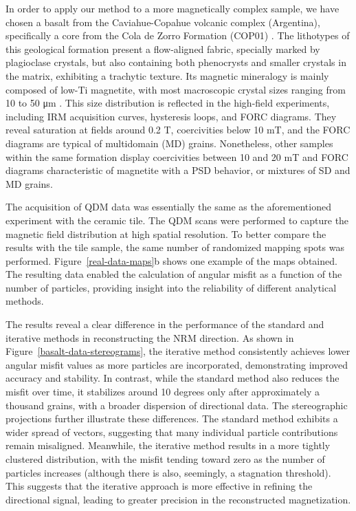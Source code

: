 In order to apply our method to a more magnetically complex sample, we have chosen a basalt from the Caviahue-Copahue volcanic complex (Argentina), specifically a core from the Cola de Zorro Formation (COP01) \citep{Moncinhatto2019}. The lithotypes of this geological formation present a flow-aligned fabric, specially marked by plagioclase crystals, but also containing both phenocrysts and smaller crystals in the matrix, exhibiting a trachytic texture. Its magnetic mineralogy is mainly composed of low-Ti magnetite, with most macroscopic crystal sizes ranging from 10 to 50 \si{\micro\meter} \citep{Moncinhatto2019}. This size distribution is reflected in the high-field experiments, including IRM acquisition curves, hysteresis loops, and FORC diagrams. They reveal saturation at fields around 0.2 \si{T}, coercivities below 10 \si{mT}, and the FORC diagrams are typical of multidomain (MD) grains. Nonetheless, other samples within the same formation display coercivities between 10 and 20 \si{mT} and FORC diagrams characteristic of magnetite with a PSD behavior, or mixtures of SD and MD grains.

The acquisition of QDM data was essentially the same as the aforementioned experiment with the ceramic tile. The QDM scans were performed to capture the magnetic field distribution at high spatial resolution. To better compare the results with the tile sample, the same number of randomized mapping spots was performed. Figure~\ref{real-data-maps}b shows one example of the maps obtained. The resulting data enabled the calculation of angular misfit as a function of the number of particles, providing insight into the reliability of different analytical methods.

The results reveal a clear difference in the performance of the standard and iterative methods in reconstructing the NRM direction. As shown in Figure~\ref{basalt-data-stereograms}, the iterative method consistently achieves lower angular misfit values as more particles are incorporated, demonstrating improved accuracy and stability. In contrast, while the standard method also reduces the misfit over time, it stabilizes around 10 degrees only after approximately a thousand grains, with a broader dispersion of directional data. The stereographic projections further illustrate these differences. The standard method exhibits a wider spread of vectors, suggesting that many individual particle contributions remain misaligned. Meanwhile, the iterative method results in a more tightly clustered distribution, with the misfit tending toward zero as the number of particles increases (although there is also, seemingly, a stagnation threshold). This suggests that the iterative approach is more effective in refining the directional signal, leading to greater precision in the reconstructed magnetization. 

